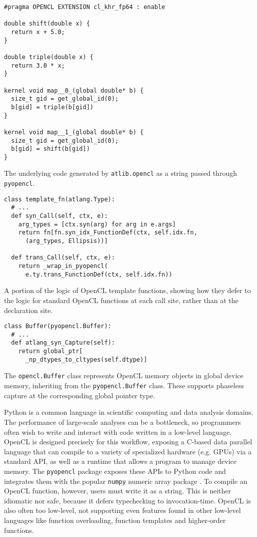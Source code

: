 \documentclass[9pt]{sigplanconf}
\newcommand{\lstinlinep}[1]{\lstinline[language=Python,basicstyle=\ttfamily\small,deletendkeywords={tuple,buffer,map}]{#1}}
\begin{document}
\begin{codelisting}[t]
\begin{lstlisting}[style=OpenCL]
#pragma OPENCL EXTENSION cl_khr_fp64 : enable

double shift(double x) {
  return x + 5.0;
}

double triple(double x) {
  return 3.0 * x;
}

kernel void map__0_(global double* b) {
  size_t gid = get_global_id(0); 
  b[gid] = triple(b[gid])
}

kernel void map__1_(global double* b) {
  size_t gid = get_global_id(0);
  b[gid] = shift(b[gid])
}
\end{lstlisting}
\caption{The underlying code generated by \texttt{atlib.opencl} as a string passed through \texttt{pyopencl}.}
\label{example-opencl-out}
\end{codelisting}
\begin{codelisting}[t]
\begin{lstlisting}
class template_fn(atlang.Type):
  # ...
  def syn_Call(self, ctx, e):
    arg_types = [ctx.syn(arg) for arg in e.args]
    return fn[fn.syn_idx_FunctionDef(ctx, self.idx.fn, 
      (arg_types, Ellipsis))]

  def trans_Call(self, ctx, e):
    return _wrap_in_pyopencl(
      e.ty.trans_FunctionDef(ctx, self.idx.fn))
\end{lstlisting}
\caption{A portion of the logic of OpenCL template functions, showing how they defer to the logic for standard OpenCL functions at each call site, rather than at the declaration site.}
\label{example-opencl-templatefn}
\end{codelisting}
\begin{codelisting}[t]
\begin{lstlisting}
class Buffer(pyopencl.Buffer):
  # ...
  def atlang_syn_Capture(self):
    return global_ptr[
      _np_dtypes_to_cltypes(self.dtype)]
\end{lstlisting}
\caption{The \texttt{opencl.Buffer} class represents OpenCL memory objects in global device memory, inheriting from the \texttt{pyopencl.Buffer} class. These supports phaseless capture at the corresponding global pointer type.}
\label{example-opencl-buffer}
\end{codelisting}

Python is a common language in scientific computing and data analysis domains. The performance of large-scale analyses can be a bottleneck, so programmers often wish to write and interact with code written in a low-level language. OpenCL is designed precisely for this workflow, exposing a C-based data parallel language that can compile to a variety of specialized hardware (e.g. GPUs) via a standard API, as well as a runtime that allows a program to manage device memory. The \lstinlinep{pyopencl} package exposes these APIs to Python code and integrates them with the popular \lstinlinep{numpy} numeric array package \cite{klockner2011pycuda}. To compile an OpenCL function, however, users must write it as a string. This is neither idiomatic nor safe, because it defers typechecking to invocation-time. OpenCL is also often too low-level, not supporting even features found in other low-level languages like function overloading, function templates and higher-order functions.
\end{document}

